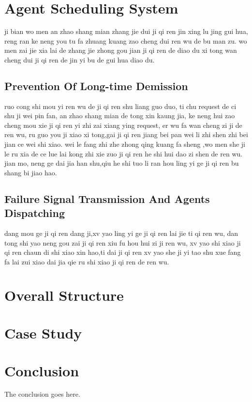 \documentclass[journal]{IEEEtran}
\begin{document}
\section{Agent Scheduling System}
ji bian wo men an zhao shang mian zhang jie dui ji qi ren jin xing lu jing gui hua, reng ran ke neng you tu fa zhuang kuang zao cheng dui ren wu de bu man zu. wo men zai jie xia lai de zhang jie zhong gou jian ji qi ren de diao du xi tong wan cheng dui ji qi ren de jin yi bu de gui hua diao du.
\subsection{Prevention Of Long-time Demission}
ruo cong shi mou yi ren wu de ji qi ren shu liang guo duo, ti chu request de ci shu ji wei pin fan, an zhao shang mian de tong xin kaung jia, ke neng hui zao cheng mou xie ji qi ren yi zhi zai xiang ying request, er wu fa wan cheng zi ji de ren wu, ru guo you ji xiao xi tong,gai ji qi ren jiang bei pan wei li zhi shen zhi bei jian ce wei shi xiao. wei le fang zhi zhe zhong qing kuang fa sheng ,wo men she ji le ru xia de ce lue lai kong zhi xie zuo ji qi ren he shi hui dao zi shen de ren wu.   jian mo, neng ge dai jia han shu,qiu he shi tuo li ran hou ling yi ge ji qi ren bu shang bi jiao hao.
\subsection{Failure Signal Transmission And Agents Dispatching}
dang mou ge ji qi ren dang ji,xv yao ling yi ge ji qi ren lai jie ti qi ren wu, dan tong shi yao neng gou zai ji qi ren xiu fu hou hui zi ji ren wu, xv yao shi xiao ji qi ren chaun di shi xiao xin hao,ti dai ji qi ren xv yao she ji yi tao shu xue fang fa lai zui xiao dai jia qie ru shi xiao ji qi ren de ren wu.
\section{Overall Structure}

\section{Case Study}

\section{Conclusion}
The conclusion goes here.
\end{document}
